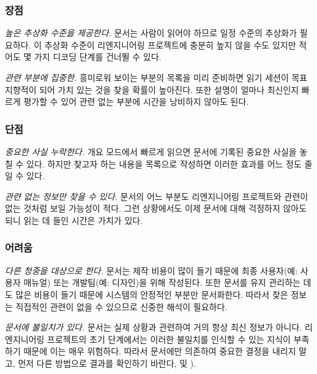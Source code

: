 \documentclass[a4paper,10pt,twoside]{book}
\begin{document}
\subsubsection*{장점}

\begin{bulletlist}
  \item \emph{높은 추상화 수준을 제공한다.}
문서는 사람이 읽어야 하므로 일정 수준의 추상화가 필요하다. 이 추상화 수준이 리엔지니어링 프로젝트에 충분히 높지 않을 수도 있지만 적어도 몇 가지 디코딩 단계를 건너뛸 수 있다.

  \item \emph{관련 부분에 집중한.}
흥미로워 보이는 부분의 목록을 미리 준비하면 읽기 세션이 목표 지향적이 되어 가치 있는 것을 찾을 확률이 높아진다. 또한 설명이 얼마나 최신인지 빠르게 평가할 수 있어 관련 없는 부분에 시간을 낭비하지 않아도 된다.
\end{bulletlist}

\subsubsection*{단점}

\begin{bulletlist}
  \item \emph{중요한 사실 누락한다.}
개요 모드에서 빠르게 읽으면 문서에 기록된 중요한 사실을 놓칠 수 있다. 하지만 찾고자 하는 내용을 목록으로 작성하면 이러한 효과를 어느 정도 줄일 수 있다.

  \item \emph{관련 없는 정보만 찾을 수 있다.}
문서의 어느 부분도 리엔지니어링 프로젝트와 관련이 없는 것처럼 보일 가능성이 적다. 그런 상황에서도 이제 문서에 대해 걱정하지 않아도 되니 읽는 데 들인 시간은 가치가 있다.

\end{bulletlist}

\subsubsection*{어려움}

\begin{bulletlist}
  \item \emph{다른 청중을 대상으로 한다.}
문서는 제작 비용이 많이 들기 때문에 최종 사용자(예: 사용자 매뉴얼) 또는 개발팀(예: 디자인)을 위해 작성된다. 또한 문서를 유지 관리하는 데도 많은 비용이 들기 때문에 시스템의 안정적인 부분만 문서화한다. 따라서 찾은 정보는 직접적인 관련이 없을 수 있으므로 신중한 해석이 필요하다.

  \item \emph{문서에 불일치가 있다.}
문서는 실제 상황과 관련하여 거의 항상 최신 정보가 아니다. 리엔지니어링 프로젝트의 초기 단계에서는 이러한 불일치를 인식할 수 있는 지식이 부족하기 때문에 이는 매우 위험하다. 따라서 문서에만 의존하여 중요한 결정을 내리지 말고, 먼저 다른 방법으로 결과를 확인하기 바란다,  및 ).
\end{bulletlist}
\end{document}
